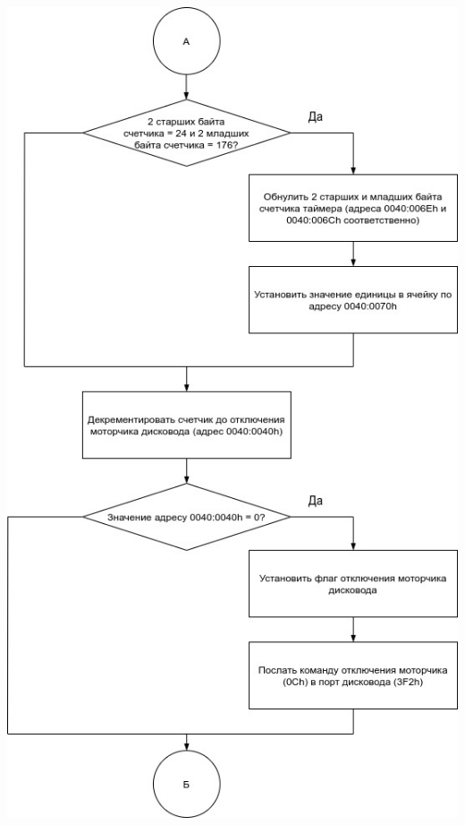 \documentclass[12pt]{extreport}
\begin{document}
\begin{center}
\newpage
\includegraphics[scale=0.6]{./inc/img/int8h_2.jpg} 

\end{center}
\end{document}
